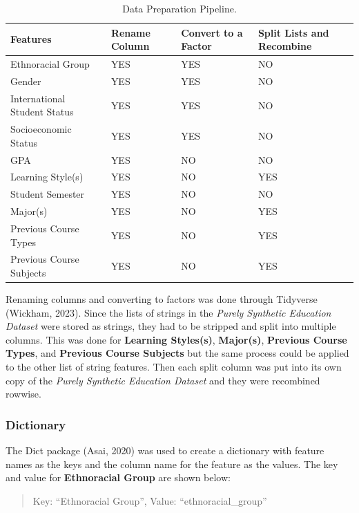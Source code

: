 \documentclass{article}
\begin{document}
\begin{table}[htbp]
    \centering
    \begin{tabular}{|l|l|l|l|}
        \hline
        \textbf{Features} & \textbf{Rename Column} & \textbf{Convert to a Factor} & \textbf{Split Lists and Recombine}\\ \hline
        Ethnoracial Group & YES & YES & NO \\ \hline
        Gender & YES & YES & NO \\ \hline
        International Student Status & YES & YES & NO \\ \hline
        Socioeconomic Status & YES & YES & NO \\ \hline
        GPA & YES & NO & NO \\ \hline
        Learning Style(s) & YES & NO & YES \\ \hline
        Student Semester & YES & NO & NO \\ \hline
        Major(s) & YES & NO & YES \\ \hline
        Previous Course Types & YES & NO & YES \\ \hline
        Previous Course Subjects & YES & NO & YES \\ \hline
    \end{tabular}
    \caption{Data Preparation Pipeline.}
    \label{tab:data_prep_table}
\end{table}

Renaming columns and converting to factors was done through Tidyverse (Wickham, 2023). Since the lists of strings in the \emph{Purely Synthetic Education Dataset} were stored as strings, they had to be stripped and split into multiple columns. This was done for \textbf{Learning Styles(s)}, \textbf{Major(s)}, \textbf{Previous Course Types}, and \textbf{Previous Course Subjects} but the same process could be applied to the other list of string features. Then each split column was put into its own copy of the \emph{Purely Synthetic Education Dataset} and they were recombined rowwise.

\subsubsection{Dictionary}\label{dictionary}

The Dict package (Asai, 2020) was used to create a dictionary with feature names as the keys and the column name for the feature as the values. The key and value for \textbf{Ethnoracial Group} are shown below:

\begin{quote}
Key: ``Ethnoracial Group'', Value: ``ethnoracial\_group''
\end{quote}
\end{document}
